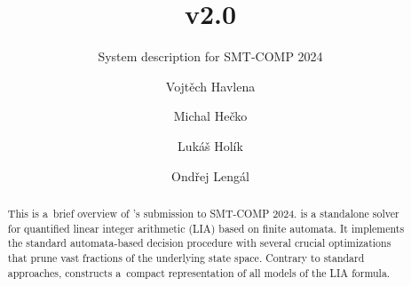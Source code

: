\documentclass[acmsmall,screen,nonacm=true]{acmart}
\begin{document}
\title{\amaya v2.0}
\subtitle{System description for SMT-COMP 2024}

\author{Vojtěch Havlena}

\author{Michal Hečko}

\author{Lukáš Holík}

\author{Ondřej Lengál}



\begin{abstract}
  This is a~brief overview of \amaya's submission to SMT-COMP 2024.
  \amaya is a standalone solver for quantified linear integer arithmetic (LIA) based on finite automata.
  It implements the standard automata-based decision procedure with several crucial optimizations that prune vast fractions of the underlying state space.
  Contrary to standard approaches, \amaya constructs a~compact representation of all models of the LIA formula.
\end{abstract}

\maketitle
\end{document}
